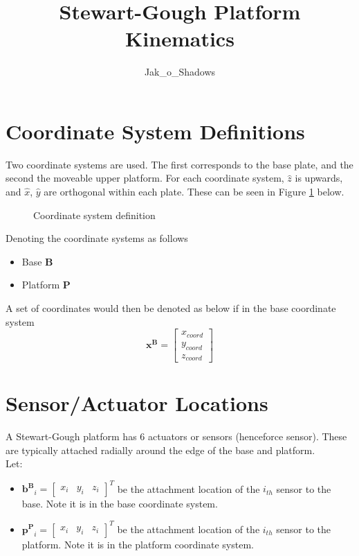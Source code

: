 \documentclass[]{article}
\title{Stewart-Gough Platform Kinematics}
\author{Jak\_o\_Shadows}
\newcommand\vect[1]{\bm{#1}} %
\begin{document}
\maketitle


\section{Coordinate System Definitions}
\par
	Two coordinate systems are used. The first corresponds to the base plate, and the second the moveable upper platform. For each coordinate system, $\hat{z}$ is upwards, and $\hat{x}$, $\hat{y}$ are orthogonal within each plate. These can be seen in Figure \ref{fig:cs} below.
	
	\begin{figure}
	\centering
	
	\caption{Coordinate system definition}
	\label{fig:cs}
	\end{figure}
	
\par
	Denoting the coordinate systems as follows
	\begin{itemize}
		\item Base $\vect{B}$
		\item Platform $\vect{P}$
	\end{itemize}
	A set of coordinates would then be denoted as below if in the base coordinate system
	$$\vect{x^B} = \begin{bmatrix}
		x_{coord} \\ 
		y_{coord} \\ 
		z_{coord}
	\end{bmatrix} $$

\section{Sensor/Actuator Locations}
\par
	A Stewart-Gough platform has 6 actuators or sensors (henceforce sensor). These are typically attached radially around the edge of the base and platform.\\
	Let:
	\begin{itemize}
		\item $\vect{b^B}_i = \begin{bmatrix}
			x_i & y_i & z_i
			\end{bmatrix}^T$ be the attachment location of the $i_{th}$ sensor to the base. Note it is in the base coordinate system.
		\item $\vect{p^P}_i = \begin{bmatrix}
			x_i & y_i & z_i
			\end{bmatrix}^T$ be the attachment location of the $i_{th}$ sensor to the platform. Note it is in the platform coordinate system.
	\end{itemize}
\end{document}
